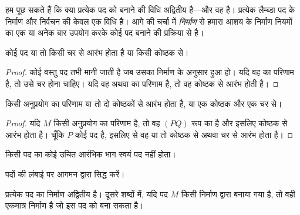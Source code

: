 \documentclass[../../../include/open-logic-section]{subfiles}
\begin{document}

हम पूछ सकते हैं कि क्या प्रत्येक पद को बनाने की विधि अद्वितीय है---और वह
है। प्रत्येक लैम्ब्डा पद के निर्माण और निर्वचन की केवल एक विधि है। आगे की
चर्चा में \emph{निर्माण} से हमारा आशय  के निर्माण
नियमों का एक या अनेक बार उपयोग करके कोई पद बनाने की प्रक्रिया से है।

\begin{lem}
कोई पद या तो किसी चर से आरंभ होता है या किसी कोष्ठक से।
\end{lem}

\begin{proof}
कोई वस्तु पद तभी मानी जाती है जब उसका निर्माण  के
अनुसार हुआ हो। यदि वह  का परिणाम है, तो उसे चर
होना चाहिए। यदि वह  अथवा
 का परिणाम है, तो वह कोष्ठक से आरंभ होती है।
\end{proof}

\begin{lem}
किसी अनुप्रयोग का परिणाम या तो दो कोष्ठकों से आरंभ होता है, या एक कोष्ठक
और एक चर से।
\end{lem}

\begin{proof}
यदि $M$ किसी अनुप्रयोग का परिणाम है, तो वह $(PQ)$ रूप का है और इसलिए
कोष्ठक से आरंभ होता है। चूँकि $P$ कोई पद है, इसलिए
 से वह या तो कोष्ठक से अथवा चर से आरंभ होता है।
\end{proof}

\begin{lem}
किसी पद का कोई उचित आरंभिक भाग स्वयं पद नहीं होता।
\end{lem}

\begin{prob}
पदों की लंबाई पर आगमन द्वारा  सिद्ध
करें।
\end{prob}

\begin{prop}[अद्वितीय पठनीयता] 
प्रत्येक पद का निर्माण अद्वितीय है। दूसरे शब्दों में, यदि पद $M$ किसी
निर्माण द्वारा बनाया गया है, तो वही एकमात्र निर्माण है जो इस पद को बना
सकता है।
\end{prop}
\end{document}
